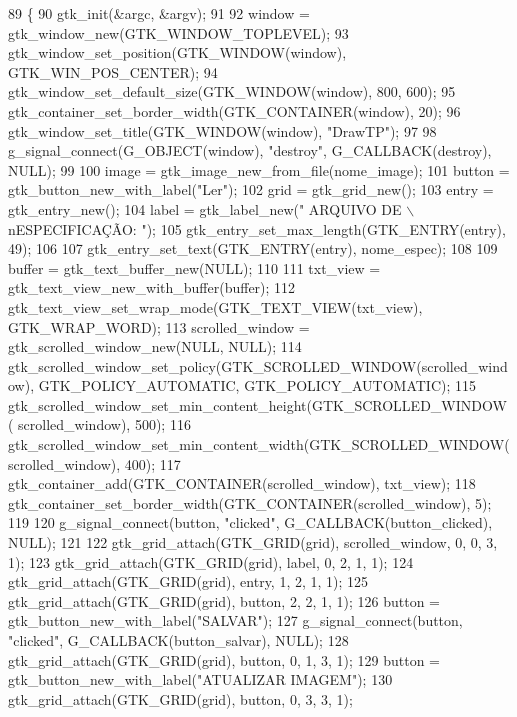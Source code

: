 \begin{DoxyCode}
89 \{
90     gtk\_init(&argc, &argv);
91 
92     window = gtk\_window\_new(GTK\_WINDOW\_TOPLEVEL);
93     gtk\_window\_set\_position(GTK\_WINDOW(window), GTK\_WIN\_POS\_CENTER);
94     gtk\_window\_set\_default\_size(GTK\_WINDOW(window), 800, 600);
95     gtk\_container\_set\_border\_width(GTK\_CONTAINER(window), 20);
96     gtk\_window\_set\_title(GTK\_WINDOW(window), \textcolor{stringliteral}{"DrawTP"});
97 
98     g\_signal\_connect(G\_OBJECT(window), \textcolor{stringliteral}{"destroy"}, G\_CALLBACK(destroy), NULL);
99 
100     image = gtk\_image\_new\_from\_file(nome_image);
101     button = gtk\_button\_new\_with\_label(\textcolor{stringliteral}{"Ler"});
102     grid = gtk\_grid\_new();
103     entry = gtk\_entry\_new();
104     label = gtk\_label\_new(\textcolor{stringliteral}{"   ARQUIVO DE \(\backslash\)nESPECIFICAÇÃO: "});
105     gtk\_entry\_set\_max\_length(GTK\_ENTRY(entry), 49);
106 
107     gtk\_entry\_set\_text(GTK\_ENTRY(entry), nome_espec);
108 
109     buffer = gtk\_text\_buffer\_new(NULL);
110 
111     txt_view = gtk\_text\_view\_new\_with\_buffer(buffer);
112     gtk\_text\_view\_set\_wrap\_mode(GTK\_TEXT\_VIEW(txt_view), GTK\_WRAP\_WORD);
113     scrolled_window = gtk\_scrolled\_window\_new(NULL, NULL);
114     gtk\_scrolled\_window\_set\_policy(GTK\_SCROLLED\_WINDOW(scrolled_window), GTK\_POLICY\_AUTOMATIC, 
      GTK\_POLICY\_AUTOMATIC);
115     gtk\_scrolled\_window\_set\_min\_content\_height(GTK\_SCROLLED\_WINDOW(
      scrolled_window), 500);
116     gtk\_scrolled\_window\_set\_min\_content\_width(GTK\_SCROLLED\_WINDOW(
      scrolled_window), 400);
117     gtk\_container\_add(GTK\_CONTAINER(scrolled_window), txt_view);
118     gtk\_container\_set\_border\_width(GTK\_CONTAINER(scrolled_window), 5);
119 
120     g\_signal\_connect(button, \textcolor{stringliteral}{"clicked"}, G\_CALLBACK(button\_clicked), NULL);
121 
122     gtk\_grid\_attach(GTK\_GRID(grid), scrolled_window, 0, 0, 3, 1);
123     gtk\_grid\_attach(GTK\_GRID(grid), label, 0, 2, 1, 1);
124     gtk\_grid\_attach(GTK\_GRID(grid), entry, 1, 2, 1, 1);
125     gtk\_grid\_attach(GTK\_GRID(grid), button, 2, 2, 1, 1);
126     button = gtk\_button\_new\_with\_label(\textcolor{stringliteral}{"SALVAR"});
127     g\_signal\_connect(button, \textcolor{stringliteral}{"clicked"}, G\_CALLBACK(button\_salvar), NULL);
128     gtk\_grid\_attach(GTK\_GRID(grid), button, 0, 1, 3, 1);
129     button = gtk\_button\_new\_with\_label(\textcolor{stringliteral}{"ATUALIZAR IMAGEM"});
130     gtk\_grid\_attach(GTK\_GRID(grid), button, 0, 3, 3, 1);

\end{DoxyCode}
